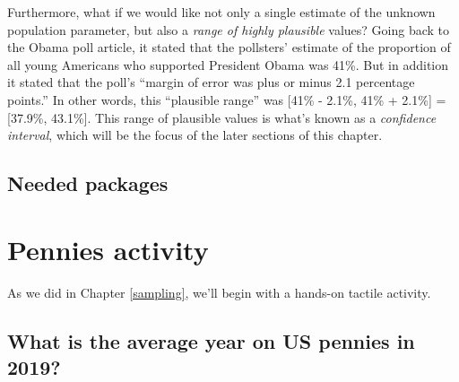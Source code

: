 \documentclass[
]{book}
\newenvironment{Shaded}{\begin{snugshade}}{\end{snugshade}}
\newcommand{\CommentTok}[1]{\textcolor[rgb]{0.56,0.35,0.01}{\textit{#1}}}
\newcommand{\ControlFlowTok}[1]{\textcolor[rgb]{0.13,0.29,0.53}{\textbf{#1}}}
\newcommand{\KeywordTok}[1]{\textcolor[rgb]{0.13,0.29,0.53}{\textbf{#1}}}
\newcommand{\NormalTok}[1]{#1}
\newcommand{\OperatorTok}[1]{\textcolor[rgb]{0.81,0.36,0.00}{\textbf{#1}}}
\newcommand{\StringTok}[1]{\textcolor[rgb]{0.31,0.60,0.02}{#1}}
\begin{document}
Furthermore, what if we would like not only a single estimate of the unknown population parameter, but also a \emph{range of highly plausible} values? Going back to the Obama poll article, it stated that the pollsters' estimate of the proportion of all young Americans who supported President Obama was 41\%. But in addition it stated that the poll's ``margin of error was plus or minus 2.1 percentage points.'' In other words, this ``plausible range'' was {[}41\% - 2.1\%, 41\% + 2.1\%{]} = {[}37.9\%, 43.1\%{]}. This range of plausible values is what's known as a \emph{confidence interval}, which will be the focus of the later sections of this chapter.

\hypertarget{needed-packages}{%
\subsection*{Needed packages}\label{needed-packages}}

\begin{Shaded}
\end{Shaded}

\hypertarget{resampling-tactile}{%
\section{Pennies activity}\label{resampling-tactile}}

As we did in Chapter \ref{sampling}, we'll begin with a hands-on tactile activity.

\hypertarget{what-is-the-average-year-on-us-pennies-in-2019}{%
\subsection{What is the average year on US pennies in 2019?}\label{what-is-the-average-year-on-us-pennies-in-2019}}
\end{document}
